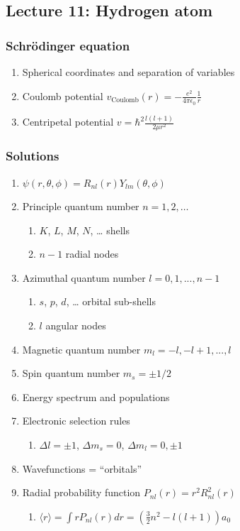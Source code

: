 \documentclass[11pt]{article}
\begin{document}
\subsection{Lecture 11: Hydrogen atom}
\label{sec:org8fce439}
\subsubsection{Schr\"{o}dinger equation}
\label{sec:org6b5de85}
\begin{enumerate}
\item Spherical coordinates and separation of variables
\item Coulomb potential \(v_\mathrm{Coulomb}(r)=-\frac{e^2}{4\pi\epsilon_0}\frac{1}{r}\)
\item Centripetal potential  \(v=\hbar^2\frac{l(l+1)}{2\mu r^2}\)
\end{enumerate}
\subsubsection{Solutions}
\label{sec:org720a866}
\begin{enumerate}
\item \(\psi(r,\theta,\phi)=R_{nl}(r)Y_{lm}(\theta,\phi)\)
\item Principle quantum number \(n=1,2,\ldots\)
\begin{enumerate}
\item \(K\), \(L\), \(M\), \(N\), \ldots{} shells
\item \(n-1\) radial nodes
\end{enumerate}
\item Azimuthal quantum number \(l=0,1,...,n-1\)
\begin{enumerate}
\item \(s\), \(p\), \(d\), \ldots{} orbital sub-shells
\item \(l\) angular nodes
\end{enumerate}
\item Magnetic quantum number \(m_l=-l,-l+1,...,l\)
\item Spin quantum number \(m_s=\pm 1/2\)
\item Energy spectrum and populations
\item Electronic selection rules
\begin{enumerate}
\item \(\Delta l=\pm 1\), \(\Delta m_s =0\), \(\Delta m_l = 0,\pm 1\)
\end{enumerate}
\item Wavefunctions = ``orbitals''
\item Radial probability function \(P_{nl}(r)=r^2 R_{nl}^2(r)\)
\begin{enumerate}
\item \(\langle r\rangle = \int r P_{nl}(r) dr = \left(\frac{3}{2}n^2-l(l+1)\right)a_0\)
\end{enumerate}
\end{enumerate}
\end{document}
